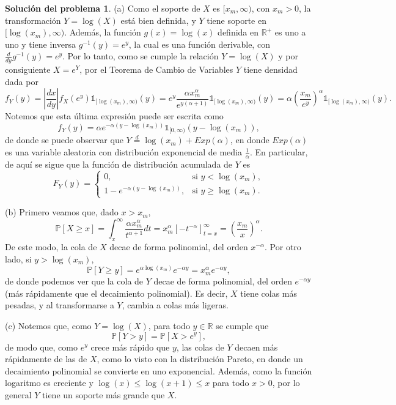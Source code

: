 \documentclass[twoside,12pt]{article}
\theoremstyle{definition}
\newtheorem{soln}{Solución del problema}
\newcommand{\RR}{\mathbb{R}}
\newcommand{\probability}[1]{\mathbb{P}\left[#1\right]}
\begin{document}
\begin{soln}
(a) Como el soporte de $X$ es $[x_m, \infty)$, con $x_m>0$, la transformación $Y=\log(X)$ está bien definida, y $Y$ tiene soporte en $[\log(x_m), \infty)$. Además, la función $g(x)=\log(x)$ definida en $\RR^{+}$ es uno a uno y tiene inversa $g^{-1}(y)=e^y$, la cual es una función derivable, con $\frac{d}{dy}{g^{-1}}(y)=e^y$. Por lo tanto, como se cumple la relación $Y=\log(X)$ y por consiguiente $X=e^Y$, por el Teorema de Cambio de Variables $Y$ tiene densidad dada por
\[
f_Y(y) = \left\lvert \frac{dx}{dy} \right\rvert f_X(e^y) \mathds{1}_{[\log(x_m), \infty)}(y) = e^y \frac{\alpha x_m^{\alpha}}{e^{y(\alpha+1)}}\mathds{1}_{[\log(x_m), \infty)}(y) = \alpha {\left(\frac{x_m}{e^y}\right)}^\alpha \mathds{1}_{[\log(x_m), \infty)}(y).
\]
Notemos que esta última expresión puede ser escrita como
\[
f_Y(y) = \alpha e^{-\alpha \left(y-\log(x_m)\right)}\mathds{1}_{[0, \infty)}(y-\log(x_m)),
\]
de donde se puede observar que $Y \stackrel{d}{=} \log(x_m)+Exp(\alpha)$, en donde $Exp(\alpha)$ es una variable aleatoria con distribución exponencial de media $\frac{1}{\alpha}$. En particular, de aquí se sigue que la función de distribución acumulada de $Y$ es
\[
F_Y(y) = \begin{cases}
  0, & \text{si } y<\log(x_m),\\
  1-e^{-\alpha(y-\log(x_m))}, & \text{si } y\geq \log(x_m).
\end{cases}
\]

(b) Primero veamos que, dado $x>x_m$,
\[
\probability{X\geq x} = \int_{x}^{\infty} \frac{\alpha x_m^{\alpha}}{t^{\alpha+1}} dt = x_m^{\alpha} {\left[-t^{-\alpha}\right]}_{t=x}^{\infty} = {\left(\frac{x_m}{x}\right)}^{\alpha}.
\]
De este modo, la cola de $X$ decae de forma polinomial, del orden $x^{-\alpha}$. Por otro lado, si $y>\log(x_m)$,
\[
\probability{Y\geq y} = e^{\alpha \log(x_m)}e^{-\alpha y} = x_m^{\alpha} e^{-\alpha y},
\]
de donde podemos ver que la cola de $Y$ decae de forma polinomial, del orden $e^{-\alpha y}$ (más rápidamente que el decaimiento polinomial). Es decir, $X$ tiene colas más pesadas, y al transformarse a $Y$, cambia a colas más ligeras.

(c) Notemos que, como $Y=\log(X)$, para todo $y\in\RR$ se cumple que
\[
\probability{Y>y} = \probability{X>e^y},
\]
de modo que, como $e^y$ crece más rápido que $y$, las colas de $Y$ decaen más rápidamente de las de $X$, como lo visto con la distribución Pareto, en donde un decaimiento polinomial se convierte en uno exponencial. Además, como la función logaritmo es creciente y $\log(x)\leq \log(x+1)\leq x$ para todo $x>0$, por lo general $Y$ tiene un soporte más grande que $X$.


\end{soln}
\end{document}
